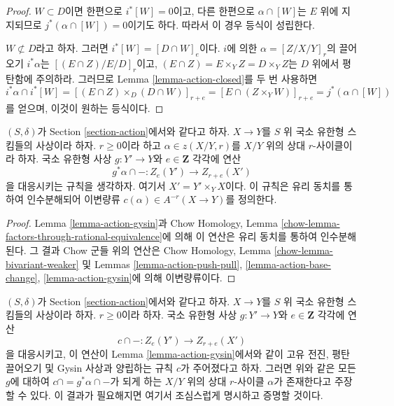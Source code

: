 \begin{proof}
\medskip\noindent
$W \subset D$이면 한편으로 $i^*[W] = 0$이고, 다른 한편으로
$\alpha \cap [W]$는 $E$ 위에 지지되므로
$j^*(\alpha \cap [W]) = 0$이기도 하다. 따라서 이 경우 등식이
성립한다.

\medskip\noindent
$W \not \subset D$라고 하자. 그러면 $i^*[W] = [D \cap W]_e$이다.
$i$에 의한 $\alpha = [Z/X/Y]_r$의 끌어오기 $i^*\alpha$는
$[(E \cap Z)/E/D]_r$이고,
$(E \cap Z) = E \times_Y Z = D \times_Y Z$는 $D$ 위에서 평탄함에
주의하라. 그러므로 Lemma \ref{lemma-action-closed}를 두 번 사용하면
$$
i^*\alpha \cap i^*[W] =
[(E \cap Z) \times_D (D \cap W)]_{r + e} =
[E \cap (Z \times_Y W)]_{r + e} =
j^*(\alpha \cap [W])
$$
를 얻으며, 이것이 원하는 등식이다.
\end{proof}

\begin{proposition}
\label{proposition-get-bivariant-class}
$(S, \delta)$가 Section \ref{section-action}에서와 같다고 하자.
$X \to Y$를 $S$ 위 국소 유한형 스킴들의 사상이라 하자.
$r \geq 0$이라 하고 $\alpha \in z(X/Y, r)$를 $X/Y$ 위의 상대
$r$-사이클이라 하자. 국소 유한형 사상 $g : Y' \to Y$와
$e \in \mathbf{Z}$ 각각에 연산
$$
g^*\alpha \cap - : Z_e(Y') \to Z_{r + e}(X')
$$
을 대응시키는 규칙을 생각하자. 여기서 $X' = Y' \times_Y X$이다.
이 규칙은 유리 동치를 통하여 인수분해되어 이변량류
$c(\alpha) \in A^{-r}(X \to Y)$를 정의한다.
\end{proposition}

\begin{proof}
Lemma \ref{lemma-action-gysin}과 Chow Homology, Lemma
\ref{chow-lemma-factors-through-rational-equivalence}에 의해 이 연산은
유리 동치를 통하여 인수분해된다. 그 결과 Chow 군들 위의 연산은
Chow Homology, Lemma \ref{chow-lemma-bivariant-weaker} 및 Lemmas
\ref{lemma-action-push-pull}, \ref{lemma-action-base-change},
\ref{lemma-action-gysin}에 의해 이변량류이다.
\end{proof}

\begin{remark}
\label{remark-characterize-relative-cycles}
$(S, \delta)$가 Section \ref{section-action}에서와 같다고 하자.
$X \to Y$를 $S$ 위 국소 유한형 스킴들의 사상이라 하자.
$r \geq 0$이라 하자. 국소 유한형 사상 $g : Y' \to Y$와
$e \in \mathbf{Z}$ 각각에 연산
$$
c \cap - : Z_e(Y') \to Z_{r + e}(X')
$$
을 대응시키고, 이 연산이 Lemma \ref{lemma-action-gysin}에서와 같이
고유 전진, 평탄 끌어오기 및 Gysin 사상과 양립하는 규칙 $c$가
주어졌다고 하자. 그러면 위와 같은 모든 $g$에 대하여
$c \cap = g^*\alpha \cap -$가 되게 하는 $X/Y$ 위의 상대
$r$-사이클 $\alpha$가 존재한다고 주장할 수 있다. 이 결과가
필요해지면 여기서 조심스럽게 명시하고 증명할 것이다.
\end{remark}



